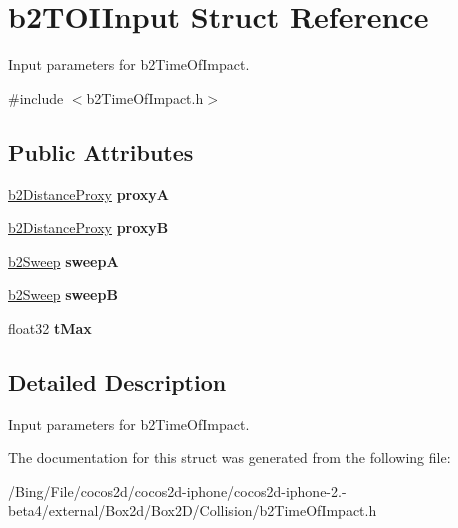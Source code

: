 \hypertarget{structb2_t_o_i_input}{\section{b2\-T\-O\-I\-Input Struct Reference}
\label{structb2_t_o_i_input}
}


Input parameters for b2\-Time\-Of\-Impact.  




{\ttfamily \#include $<$b2\-Time\-Of\-Impact.\-h$>$}

\subsection*{Public Attributes}
\begin{DoxyCompactItemize}
\item 
\hypertarget{structb2_t_o_i_input_a5c5fb931435d92ac2d2080552400cd57}{\hyperlink{structb2_distance_proxy}{b2\-Distance\-Proxy} {\bfseries proxy\-A}}\label{structb2_t_o_i_input_a5c5fb931435d92ac2d2080552400cd57}

\item 
\hypertarget{structb2_t_o_i_input_a7f4e614d1c574006402e9610c984a93f}{\hyperlink{structb2_distance_proxy}{b2\-Distance\-Proxy} {\bfseries proxy\-B}}\label{structb2_t_o_i_input_a7f4e614d1c574006402e9610c984a93f}

\item 
\hypertarget{structb2_t_o_i_input_adf63a4b9969aa839c2d520bf6d76148a}{\hyperlink{structb2_sweep}{b2\-Sweep} {\bfseries sweep\-A}}\label{structb2_t_o_i_input_adf63a4b9969aa839c2d520bf6d76148a}

\item 
\hypertarget{structb2_t_o_i_input_af506b6adc7eca852f08460ec76c7b9a7}{\hyperlink{structb2_sweep}{b2\-Sweep} {\bfseries sweep\-B}}\label{structb2_t_o_i_input_af506b6adc7eca852f08460ec76c7b9a7}

\item 
\hypertarget{structb2_t_o_i_input_a365a434996de60957777a673918d3a5f}{float32 {\bfseries t\-Max}}\label{structb2_t_o_i_input_a365a434996de60957777a673918d3a5f}

\end{DoxyCompactItemize}


\subsection{Detailed Description}
Input parameters for b2\-Time\-Of\-Impact. 

The documentation for this struct was generated from the following file\-:\begin{DoxyCompactItemize}
\item 
/\-Bing/\-File/cocos2d/cocos2d-\/iphone/cocos2d-\/iphone-\/2.-\/beta4/external/\-Box2d/\-Box2\-D/\-Collision/b2\-Time\-Of\-Impact.\-h\end{DoxyCompactItemize}

